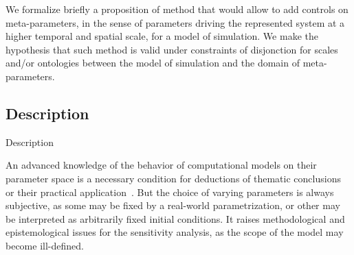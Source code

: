 
We formalize briefly a proposition of method that would allow to add controls on meta-parameters, in the sense of parameters driving the represented system at a higher temporal and spatial scale, for a model of simulation. We make the hypothesis that such method is valid under constraints of disjonction for scales and/or ontologies between the model of simulation and the domain of meta-parameters.


\subsection{Description}{Description}

An advanced knowledge of the behavior of computational models on their parameter space is a necessary condition for deductions of thematic conclusions 
 or their practical application~\cite{banos2013pour}. But the choice of varying parameters is always subjective, as some may be fixed by a real-world parametrization, or other may be interpreted as arbitrarily fixed initial conditions. It raises methodological and epistemological issues for the sensitivity analysis, as the scope of the model may become ill-defined. 

